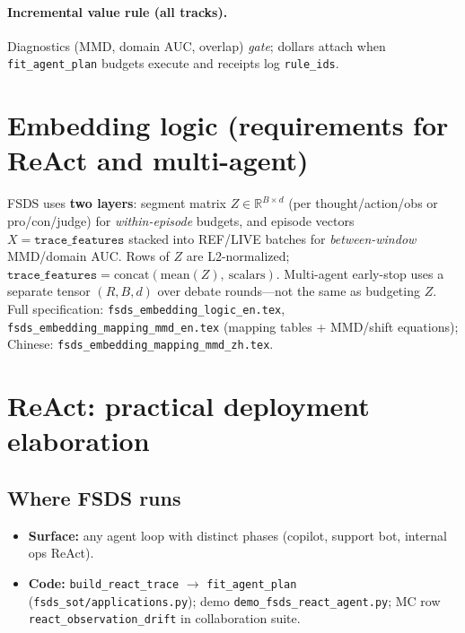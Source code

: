 \documentclass[11pt]{article}
\begin{document}
\paragraph{Incremental value rule (all tracks).}
Diagnostics (MMD, domain AUC, overlap) \emph{gate}; dollars attach when \texttt{fit\_agent\_plan} budgets execute and receipts log \texttt{rule\_ids}.

\section{Embedding logic (requirements for ReAct and multi-agent)}
\label{sec:embedding}
FSDS uses \textbf{two layers}: segment matrix $Z\in\mathbb{R}^{B\times d}$ (per thought/action/obs or pro/con/judge) for \emph{within-episode} budgets, and episode vectors $X=\texttt{trace\_features}$ stacked into REF/LIVE batches for \emph{between-window} MMD/domain AUC.
Rows of $Z$ are L2-normalized; $\texttt{trace\_features}=\mathrm{concat}(\mathrm{mean}(Z),\ \text{scalars})$.
Multi-agent early-stop uses a separate tensor $(R,B,d)$ over debate rounds---not the same as budgeting $Z$.
Full specification: \texttt{fsds\_embedding\_logic\_en.tex}, \texttt{fsds\_embedding\_mapping\_mmd\_en.tex} (mapping tables + MMD/shift equations); Chinese: \texttt{fsds\_embedding\_mapping\_mmd\_zh.tex}.

\section{ReAct: practical deployment elaboration}
\label{sec:react-practical}

\subsection{Where FSDS runs}
\begin{itemize}[nosep]
  \item \textbf{Surface:} any agent loop with distinct phases (copilot, support bot, internal ops ReAct).
  \item \textbf{Code:} \texttt{build\_react\_trace} $\rightarrow$ \texttt{fit\_agent\_plan} (\texttt{fsds\_sot/applications.py}); demo \texttt{demo\_fsds\_react\_agent.py}; MC row \texttt{react\_observation\_drift} in collaboration suite.
\end{itemize}
\end{document}
